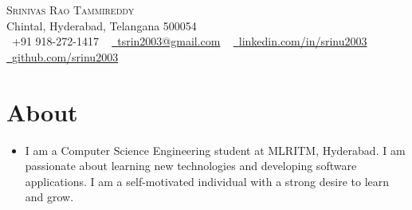 \documentclass[a4paper,11pt]{article}
\begin{document}

\begin{center}

    {\Huge \scshape Srinivas Rao Tammireddy} \\ \vspace{2pt}
    Chintal, Hyderabad, Telangana 500054 \\ \vspace{1pt}
    \small \raisebox{-0.1\height}
    \faPhone\ +91 918-272-1417 ~
    \href{mailto:tsrin2003@gmail.com}{\raisebox{-0.2\height}\faEnvelope\  {tsrin2003@gmail.com}} ~
    \href{https://linkedin.com/in/srinu2003/}{\raisebox{-0.2\height}\faLinkedin\ {linkedin.com/in/srinu2003}}  ~
    \href{https://github.com/srinu2003}{\raisebox{-0.2\height}\faGithub\ {github.com/srinu2003}}
    \vspace{-8pt}
  \end{center}

\section{About}
  \begin{itemize}[leftmargin=0.15in, label={}]
    \item \fontsize{10}{12} \selectfont
    I am a Computer Science Engineering student at MLRITM, Hyderabad. I am passionate about learning new technologies and developing software applications. I am a self-motivated individual with a strong desire to learn and grow.
  \end{itemize}
    


\end{document}
